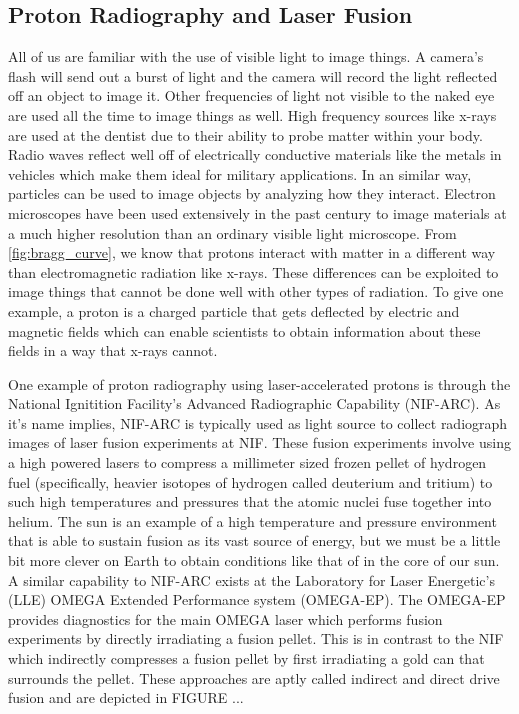 \subsection{Proton Radiography and Laser Fusion}

All of us are familiar with the use of visible light to image things. A camera's flash will send out a burst of light and the camera will record the light reflected off an object to image it. Other frequencies of light not visible to the naked eye are used all the time to image things as well. High frequency sources like x-rays are used at the dentist due to their ability to probe matter within your body. Radio waves reflect well off of electrically conductive materials like the metals in vehicles which make them ideal for military applications. In an similar way, particles can be used to image objects by analyzing how they interact. Electron microscopes have been used extensively in the past century to image materials at a much higher resolution than an ordinary visible light microscope. From \autoref{fig:bragg_curve}, we know that protons interact with matter in a different way than electromagnetic radiation like x-rays. These differences can be exploited to image things that cannot be done well with other types of radiation. To give one example, a proton is a charged particle that gets deflected by electric and magnetic fields which can enable scientists to obtain information about these fields in a way that x-rays cannot.

One example of proton radiography using laser-accelerated protons is through the National Ignitition Facility's Advanced Radiographic Capability (NIF-ARC). As it's name implies, NIF-ARC is typically used as light source to collect radiograph images of laser fusion experiments at NIF. These fusion experiments involve using a high powered lasers to compress a millimeter sized frozen pellet of hydrogen fuel (specifically, heavier isotopes of hydrogen called deuterium and tritium) to such high temperatures and pressures that the atomic nuclei fuse together into helium. The sun is an example of a high temperature and pressure environment that is able to sustain fusion as its vast source of energy, but we must be a little bit more clever on Earth to obtain conditions like that of in the core of our sun. A similar capability to NIF-ARC exists at the Laboratory for Laser Energetic's (LLE) OMEGA Extended Performance system (OMEGA-EP). The OMEGA-EP provides diagnostics for the main OMEGA laser which performs fusion experiments by directly irradiating a fusion pellet. This is in contrast to the NIF which indirectly compresses a fusion pellet by first irradiating a gold can that surrounds the pellet. These approaches are aptly called indirect and direct drive fusion and are depicted in FIGURE ...

